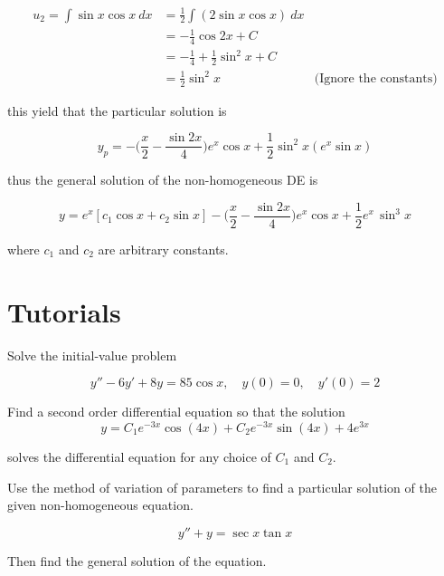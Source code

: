 \begin{solution}
    \begin{align*}
        u_2 = \int \sin x \cos x \> dx &= \frac{1}{2} \int (2 \sin x \cos x) \> dx\\
        &= -\frac{1}{4} \cos 2x + C \\
        &= -\frac{1}{4} + \frac{1}{2} \sin^2 x + C\\
        &= \frac{1}{2} \sin^2 x & \text{(Ignore the constants)}
    \end{align*}

    this yield that the particular solution is 

    \[
        y_p = - \biggl(\frac{x}{2} - \frac{\sin 2x}{4} \biggr) e^x \cos x 
        + \frac{1}{2} \sin^2 x (e^x \sin x)
    \]

    thus the general solution of the non-homogeneous DE is
    
    \[
        y = e^x[c_1 \cos x + c_2 \sin x] - \biggl(\frac{x}{2} - \frac{\sin 2x}{4} \biggr) e^x \cos x 
        + \frac{1}{2} e^x \, \sin^3 x
    \]

    where $c_1$ and $c_2$ are arbitrary constants.
\end{solution}

\section{Tutorials}

\begin{mdframed}
    \vspace{-0.25cm}
    \hspace{-0.25cm}
    \begin{Exercise}
        Solve the initial-value problem

        \[
            y'' - 6y' + 8y = 85\cos x, \quad y(0) = 0, \quad y'(0) = 2
        \]
    \end{Exercise}

    \begin{Exercise}
        Find a second order differential equation so that the solution
        \[
            y = C_1 e^{-3x} \cos(4x) + C_2 e^{-3x} \sin(4x) + 4e^{3x}
        \]

        solves the differential equation for any choice of $C_1$ and $C_2$.
    \end{Exercise}

    \begin{Exercise}
        Use the method of variation of parameters to find a particular solution 
        of the given non-homogeneous equation. 
        
        \[
            y'' + y = \sec x \tan x
        \]
        
        Then find the general solution 
        of the equation.
    \end{Exercise}
\end{mdframed}